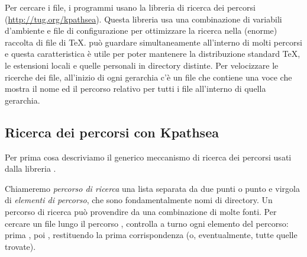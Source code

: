 \documentclass{article}
\begin{document}
Per cercare i file, i programmi \Webc{} usano la libreria di ricerca dei
percorsi \KPS{} (\url{http://tug.org/kpathsea}). Questa libreria usa una
combinazione di variabili d'ambiente e file di configurazione per
ottimizzare la ricerca nella (enorme) raccolta di file di \TeX{}. \Webc{}
può guardare simultaneamente all'interno di molti percorsi e questa
caratteristica è utile per poter mantenere la distribuzione standard
\TeX{}, le estensioni locali e quelle personali in directory distinte. Per
velocizzare le ricerche dei file, all'inizio di ogni gerarchia c'è un file
 che contiene una voce che mostra il nome ed il percorso
relativo per tutti i file all'interno di quella gerarchia.


\subsection{Ricerca dei percorsi con Kpathsea}
\label{sec:kpathsea}

Per prima cosa descriviamo il generico meccanismo di ricerca dei percorsi
usati dalla libreria \KPS{}.

Chiameremo \emph{percorso di ricerca} una lista separata da due punti o
punto e virgola di \emph{elementi di percorso}, che sono fondamentalmente
nomi di directory. Un percorso di ricerca può provendire da una
combinazione di molte fonti. Per cercare un file  lungo il
percorso , \KPS{} controlla a turno ogni elemento del
percorso: prima , poi , restituendo la
prima corrispondenza (o, eventualmente, tutte quelle trovate).
\end{document}
